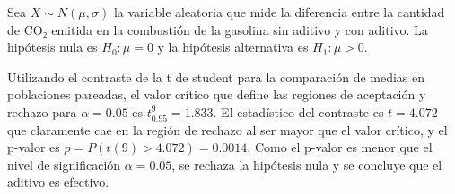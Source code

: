 \documentclass[
  a4paper,
]{scrreport}
\theoremstyle{definition}
\theoremstyle{remark}
\begin{document}
\begin{tcolorbox}[enhanced jigsaw, colbacktitle=quarto-callout-tip-color!10!white, bottomrule=.15mm, bottomtitle=1mm, rightrule=.15mm, colback=white, left=2mm, opacityback=0, title=\textcolor{quarto-callout-tip-color}{\faLightbulb}\hspace{0.5em}{Solución}, leftrule=.75mm, arc=.35mm, titlerule=0mm, coltitle=black, opacitybacktitle=0.6, colframe=quarto-callout-tip-color-frame, breakable, toprule=.15mm, toptitle=1mm]

Sea \(X\sim N(\mu,\sigma)\) la variable aleatoria que mide la diferencia
entre la cantidad de CO₂ emitida en la combustión de la gasolina sin
aditivo y con aditivo. La hipótesis nula es \(H_0: \mu = 0\) y la
hipótesis alternativa es \(H_1: \mu>0\).

Utilizando el contraste de la t de student para la comparación de medias
en poblaciones pareadas, el valor crítico que define las regiones de
aceptación y rechazo para \(\alpha=0.05\) es \(t^9_{0.95}=1.833\). El
estadístico del contraste es \(t=4.072\) que claramente cae en la región
de rechazo al ser mayor que el valor crítico, y el p-valor es
\(p = P(t(9)>4.072) = 0.0014\). Como el p-valor es menor que el nivel de
significación \(\alpha = 0.05\), se rechaza la hipótesis nula y se
concluye que el aditivo es efectivo.

\end{tcolorbox}
\end{document}
